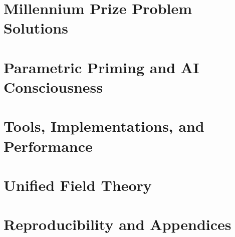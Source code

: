 \documentclass[11pt,a4paper]{report}
\theoremstyle{definition}
\begin{document}
\part{Millennium Prize Problem Solutions}


\part{Parametric Priming and AI Consciousness}


\part{Tools, Implementations, and Performance}


\part{Unified Field Theory}


\part{Reproducibility and Appendices}




\end{document}
